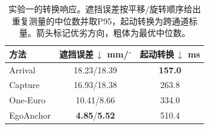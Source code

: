 \begin{table}[t]
\centering
\caption{实验一的转换响应。遮挡误差按平移/旋转顺序给出重复测量的中位数并取P95，起动转换为跨通道标量。箭头标记优劣方向，粗体为最优中位数。}
\label{tab:exp1-transition}
\begin{tabular}{@{}lcc@{}}
\toprule
方法 & \shortstack{遮挡误差\,$\downarrow$\\mm/$^\circ$} & \shortstack{起动转换\,$\downarrow$\\ms} \\
\midrule
Arrival & 18.23/18.39 & \textbf{157.0} \\
Capture & 16.93/18.38 & 263.8 \\
One-Euro & 10.41/8.66 & 334.0 \\
EgoAnchor & \textbf{4.85}/\textbf{5.52} & 510.4 \\
\bottomrule
\end{tabular}
\end{table}
